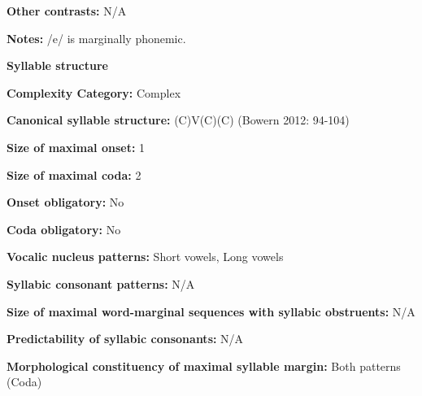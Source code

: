 \begin{styleBody}
\textbf{Other contrasts:} N/A
\end{styleBody}

\begin{styleBody}
\textbf{Notes:} /e/ is marginally phonemic.
\end{styleBody}

\begin{styleBody}
\textbf{Syllable structure}
\end{styleBody}

\begin{styleBody}
\textbf{Complexity Category:} Complex
\end{styleBody}

\begin{styleBody}
\textbf{Canonical syllable structure:} (C)V(C)(C) (Bowern 2012: 94-104)
\end{styleBody}

\begin{styleBody}
\textbf{Size of maximal onset:} 1
\end{styleBody}

\begin{styleBody}
\textbf{Size of maximal coda:} 2
\end{styleBody}

\begin{styleBody}
\textbf{Onset obligatory:} No
\end{styleBody}

\begin{styleBody}
\textbf{Coda obligatory:} No
\end{styleBody}

\begin{styleBody}
\textbf{Vocalic nucleus patterns:} Short vowels, Long vowels
\end{styleBody}

\begin{styleBody}
\textbf{Syllabic consonant patterns:} N/A
\end{styleBody}

\begin{styleBody}
\textbf{Size of maximal word{}-marginal sequences with syllabic obstruents:} N/A
\end{styleBody}

\begin{styleBody}
\textbf{Predictability of syllabic consonants:} N/A
\end{styleBody}

\begin{styleBody}
\textbf{Morphological constituency of maximal syllable margin:} Both patterns (Coda)
\end{styleBody}

